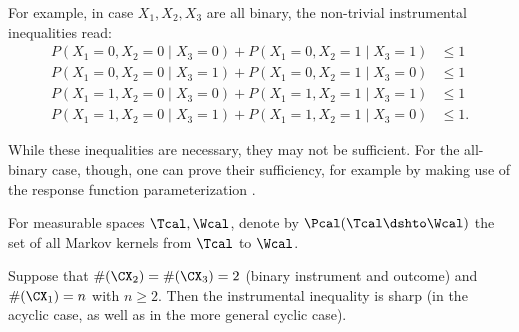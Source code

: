 \begin{Eg}\label{eg:instrumental_inequality_binary}
  For example, in case $X_1,X_2,X_3$ are all binary, the non-trivial instrumental inequalities read:
  \begin{align*}
    P(X_1=0,X_2=0 \mid X_3=0) + P(X_1=0,X_2=1 \mid X_3=1) &\le 1 \\
    P(X_1=0,X_2=0 \mid X_3=1) + P(X_1=0,X_2=1 \mid X_3=0) &\le 1 \\
    P(X_1=1,X_2=0 \mid X_3=0) + P(X_1=1,X_2=1 \mid X_3=1) &\le 1 \\
    P(X_1=1,X_2=0 \mid X_3=1) + P(X_1=1,X_2=1 \mid X_3=0) &\le 1.
  \end{align*}
\end{Eg}
While these inequalities are necessary, they may not be sufficient. For the all-binary case, though, one can prove their sufficiency,
for example by making use of the response function parameterization \cite{Bonet2001}.
\begin{Not}
  For measurable spaces $\Tcal, \Wcal$, denote by $\Pcal(\Tcal \dshto \Wcal)$ the set of all Markov kernels from $\Tcal$ to $\Wcal$.
\end{Not}
\begin{Prp}\label{prp:instrumental_inequality_completeness}
  Suppose that $\#(\CX_2)=\#(\CX_3) = 2$ (binary instrument and outcome) and $\#(\CX_1)=n$ with $n \ge 2$.
  Then the instrumental inequality  is sharp (in the acyclic case, as well as in the more general cyclic case).
\end{Prp}
